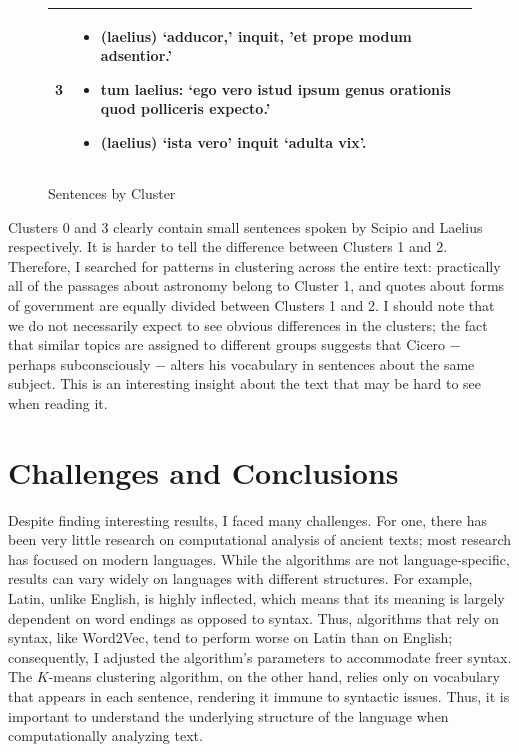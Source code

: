 \documentclass[a4paper, 12pt,notitlepage]{article} %
\newenvironment{figurecenter}{%
	\setlength\topsep{-7pt}
	\setlength\parskip{-7pt}
	\singlespacing %
	\begin{center}
	}{%
	\end{center}
\vspace{-5pt}
}
\numberwithin{dummy}{subsection}
\numberwithin{dummy}{section}
\theoremstyle{named}
\theoremstyle{definition}
\theoremstyle{definition}
\begin{document}
\begin{figure}[H]
\begin{figurecenter}
\begin{tabular}{|c|m{14cm}|}
				\hline
				{\textbf{3}} &  \begin{itemize}[leftmargin=*] \vspace{-0.3cm} \itemsep -0.15cm \item (laelius) `adducor,' inquit, 'et prope modum adsentior.' \cite[I.61]{drp} \item tum laelius: `ego vero istud ipsum genus orationis quod polliceris expecto.' \cite[I.38]{drp} \item (laelius) `ista vero' inquit `adulta vix'. \cite[I.58]{drp} \vspace{-0.4cm} \end{itemize}  \\ 
				\hline
			\end{tabular}
			\caption{Sentences by Cluster}
			\label{theta}

	\end{figurecenter}
\end{figure}

\noindent Clusters 0 and 3 clearly contain small sentences spoken by Scipio and Laelius respectively. It is harder to tell the difference between Clusters 1 and 2. Therefore, I searched for patterns in clustering across the entire text: practically all of the passages about astronomy belong to Cluster 1, and quotes about forms of government are equally divided between Clusters 1 and 2. I should note that we do not necessarily expect to see obvious differences in the clusters; the fact that similar topics are assigned to different groups suggests that Cicero $-$ perhaps subconsciously $-$ alters his vocabulary in sentences about the same subject. This is an interesting insight about the text that may be hard to see when reading it.

\section{Challenges and Conclusions}

Despite finding interesting results, I faced many challenges. For one, there has been very little research on computational analysis of ancient texts; most research has focused on modern languages. While the algorithms are not language-specific, results can vary widely on languages with different structures. For example, Latin, unlike English, is highly inflected, which means that its meaning is largely dependent on word endings as opposed to syntax. Thus, algorithms that rely on syntax, like Word2Vec, tend to perform worse on Latin than on English; consequently, I adjusted the algorithm's parameters to accommodate freer syntax. The $K$-means clustering algorithm, on the other hand, relies only on vocabulary that appears in each sentence, rendering it immune to syntactic issues. Thus, it is important to understand the underlying structure of the language when computationally analyzing text.
\end{document}
